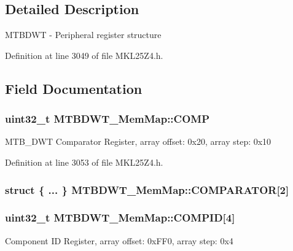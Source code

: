\subsection{Detailed Description}
M\+T\+B\+D\+WT -\/ Peripheral register structure 

Definition at line 3049 of file M\+K\+L25\+Z4.\+h.



\subsection{Field Documentation}
\subsubsection[{\texorpdfstring{C\+O\+MP}{COMP}}]{\setlength{\rightskip}{0pt plus 5cm}uint32\+\_\+t M\+T\+B\+D\+W\+T\+\_\+\+Mem\+Map\+::\+C\+O\+MP}\hypertarget{struct_m_t_b_d_w_t___mem_map_a2dc253306d19e9f365e7ac79eecb8f07}{}\label{struct_m_t_b_d_w_t___mem_map_a2dc253306d19e9f365e7ac79eecb8f07}
M\+T\+B\+\_\+\+D\+WT Comparator Register, array offset\+: 0x20, array step\+: 0x10 

Definition at line 3053 of file M\+K\+L25\+Z4.\+h.

\subsubsection[{\texorpdfstring{C\+O\+M\+P\+A\+R\+A\+T\+OR}{COMPARATOR}}]{\setlength{\rightskip}{0pt plus 5cm}struct \{ ... \}   M\+T\+B\+D\+W\+T\+\_\+\+Mem\+Map\+::\+C\+O\+M\+P\+A\+R\+A\+T\+OR\mbox{[}2\mbox{]}}\hypertarget{struct_m_t_b_d_w_t___mem_map_adba23d153aeddebbab1e08585bed8c54}{}\label{struct_m_t_b_d_w_t___mem_map_adba23d153aeddebbab1e08585bed8c54}
\subsubsection[{\texorpdfstring{C\+O\+M\+P\+ID}{COMPID}}]{\setlength{\rightskip}{0pt plus 5cm}uint32\+\_\+t M\+T\+B\+D\+W\+T\+\_\+\+Mem\+Map\+::\+C\+O\+M\+P\+ID\mbox{[}4\mbox{]}}\hypertarget{struct_m_t_b_d_w_t___mem_map_a4a32a81244f65ec304572767d33fcbce}{}\label{struct_m_t_b_d_w_t___mem_map_a4a32a81244f65ec304572767d33fcbce}
Component ID Register, array offset\+: 0x\+F\+F0, array step\+: 0x4 

